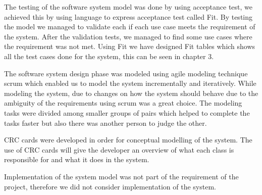 The testing of the software system model was done by using acceptance test, we achieved this by using language to express acceptance test called Fit. By testing the model we managed to validate each if each use case meets the requirement of the system. After the validation tests, we managed to find some use cases where the requirement was not met. Using Fit we have designed Fit tables which shows all the test cases done for the system, this can be seen in chapter 3.

The software system design phase was modeled using agile modeling technique scrum which enabled us to model the system incrementally and iteratively. While modeling the system, due to changes on how the system should behave due to the ambiguity of the requirements using scrum was a great choice.  The modeling tasks were divided among smaller groups of pairs which helped to complete the tasks faster but also there was another person to judge the other. 

CRC cards were developed in order for conceptual modelling of the system.  The use of CRC cards will give the developer an overview of what each class is responsible for and what it does in the system. 

Implementation of the system model was not part of the requirement of the project, therefore we did not consider implementation of the system.

